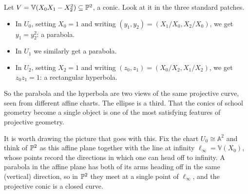 \documentclass[a4paper]{scrartcl}
\newcommand{\A}{\mathbb{A}}
\newcommand{\V}{\mathbb{V}}
\begin{document}
\begin{example}\label{ex:conicpatches}
	Let $V = \V(X_0X_1 - X_2^2) \subseteq \PP^2$, a conic. Look at it in the three standard patches.
	\begin{itemize}
		\item In $U_0$, setting $X_0 = 1$ and writing $(y_1,y_2) = (X_1/X_0, X_2/X_0)$, we get $y_1 = y_2^2$: a parabola.
		\item In $U_1$ we similarly get a parabola.
		\item In $U_2$, setting $X_2 = 1$ and writing $(z_0,z_1) = (X_0/X_2, X_1/X_2)$, we get $z_0z_1 = 1$: a rectangular hyperbola.
	\end{itemize}
	So the parabola and the hyperbola are two views of the same projective curve, seen from different affine charts. The ellipse is a third. That the conics of school geometry become a single object is one of the most satisfying features of projective geometry.
\end{example}

It is worth drawing the picture that goes with this. Fix the chart $U_0 \cong \A^2$ and think of $\mathbb{P}^2$ as this affine plane together with the line at infinity $\ell_\infty = \V(X_0)$, whose points record the directions in which one can head off to infinity. A parabola in the affine plane has both of its arms heading off in the same (vertical) direction, so in $\mathbb{P}^2$ they meet at a single point of $\ell_\infty$, and the projective conic is a closed curve.

\begin{center}
\end{center}
\end{document}
